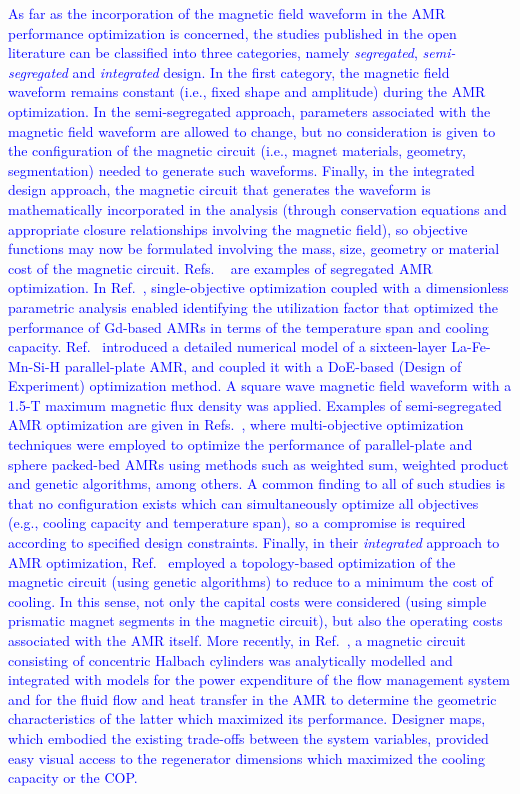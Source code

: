 \documentclass[referee]{svjour3}
\begin{document}
\textcolor{blue}{As far as the incorporation of the magnetic field waveform in the AMR performance optimization is concerned, the studies published in the open literature can be classified into three categories, namely \textit{segregated}, \textit{semi-segregated} and \textit{integrated} design. In the first category, the magnetic field waveform remains constant (i.e., fixed shape and amplitude) during the AMR optimization. In the semi-segregated approach, parameters associated with the magnetic field waveform are allowed to change, but no consideration is given to the configuration of the magnetic circuit (i.e., magnet materials, geometry, segmentation) needed to generate such waveforms. Finally, in the integrated design approach, the magnetic circuit that generates the waveform is mathematically incorporated in the analysis (through conservation equations and appropriate closure relationships involving the magnetic field), so objective functions may now be formulated involving the mass, size, geometry or material cost of the magnetic circuit. Refs.
~\cite{bib:Momen2014,bib:ZhangSR2017} are examples of segregated AMR optimization. In Ref.~\cite{bib:Momen2014}, single-objective optimization coupled with a dimensionless parametric analysis enabled identifying the utilization factor that optimized the performance of Gd-based AMRs in terms of the temperature span and cooling capacity. Ref.~\cite{bib:ZhangSR2017} introduced a detailed numerical model of a sixteen-layer La-Fe-Mn-Si-H parallel-plate AMR, and  coupled it with a DoE-based (Design of Experiment)  optimization method. A square wave magnetic field waveform with a 1.5-T maximum magnetic flux density was applied. Examples of semi-segregated AMR optimization are given in Refs.~\cite{bib:Bouchekara2014,bib:Ganjehsarabi2016,bib:Roy2017}, where  multi-objective optimization techniques were employed to optimize the performance of parallel-plate \cite{bib:Roy2017} and sphere packed-bed AMRs \cite{bib:Ganjehsarabi2016} using methods such as weighted sum, weighted product and genetic algorithms, among others. A common finding to all of such studies is that no configuration exists which can simultaneously optimize all objectives (e.g., cooling capacity and temperature span), so a compromise is required according to specified design constraints. Finally, in their \textit{integrated} approach to AMR optimization, Ref.~\cite{bib:teyber17_perman} employed a topology-based optimization of the magnetic circuit (using genetic algorithms) to reduce to a minimum the cost of cooling. In this sense, not only the capital costs were considered (using simple prismatic magnet segments in the magnetic circuit), but also the operating costs associated with the AMR itself. More recently, in Ref.~\cite{bib:fortkamp20-desig}, a magnetic circuit consisting of concentric Halbach cylinders was analytically modelled and integrated with models for the power expenditure of the flow management system and for the fluid flow and heat transfer in the AMR to determine the geometric characteristics of the latter which maximized its performance. Designer maps, which embodied the existing trade-offs between the system variables, provided easy visual access to the regenerator dimensions which maximized the cooling capacity or the COP.}
\end{document}
